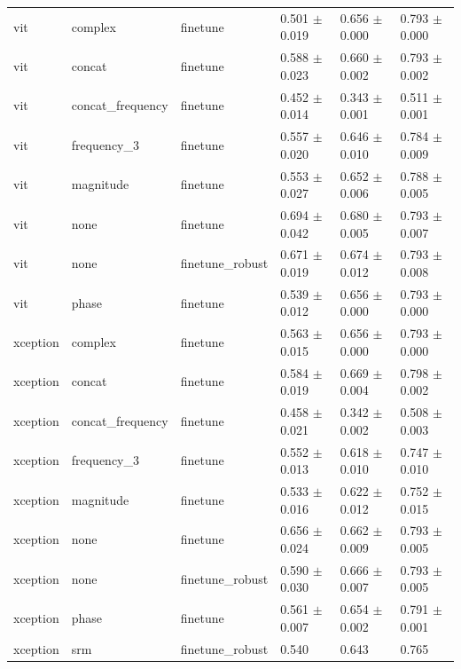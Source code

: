 \begin{table}
\begin{tabular}{llllll}
vit & complex & finetune & 0.501 $\pm$ 0.019 & 0.656 $\pm$ 0.000 & 0.793 $\pm$ 0.000 \\
vit & concat & finetune & 0.588 $\pm$ 0.023 & 0.660 $\pm$ 0.002 & 0.793 $\pm$ 0.002 \\
vit & concat_frequency & finetune & 0.452 $\pm$ 0.014 & 0.343 $\pm$ 0.001 & 0.511 $\pm$ 0.001 \\
vit & frequency_3 & finetune & 0.557 $\pm$ 0.020 & 0.646 $\pm$ 0.010 & 0.784 $\pm$ 0.009 \\
vit & magnitude & finetune & 0.553 $\pm$ 0.027 & 0.652 $\pm$ 0.006 & 0.788 $\pm$ 0.005 \\
vit & none & finetune & 0.694 $\pm$ 0.042 & 0.680 $\pm$ 0.005 & 0.793 $\pm$ 0.007 \\
vit & none & finetune_robust & 0.671 $\pm$ 0.019 & 0.674 $\pm$ 0.012 & 0.793 $\pm$ 0.008 \\
vit & phase & finetune & 0.539 $\pm$ 0.012 & 0.656 $\pm$ 0.000 & 0.793 $\pm$ 0.000 \\
xception & complex & finetune & 0.563 $\pm$ 0.015 & 0.656 $\pm$ 0.000 & 0.793 $\pm$ 0.000 \\
xception & concat & finetune & 0.584 $\pm$ 0.019 & 0.669 $\pm$ 0.004 & 0.798 $\pm$ 0.002 \\
xception & concat_frequency & finetune & 0.458 $\pm$ 0.021 & 0.342 $\pm$ 0.002 & 0.508 $\pm$ 0.003 \\
xception & frequency_3 & finetune & 0.552 $\pm$ 0.013 & 0.618 $\pm$ 0.010 & 0.747 $\pm$ 0.010 \\
xception & magnitude & finetune & 0.533 $\pm$ 0.016 & 0.622 $\pm$ 0.012 & 0.752 $\pm$ 0.015 \\
xception & none & finetune & 0.656 $\pm$ 0.024 & 0.662 $\pm$ 0.009 & 0.793 $\pm$ 0.005 \\
xception & none & finetune_robust & 0.590 $\pm$ 0.030 & 0.666 $\pm$ 0.007 & 0.793 $\pm$ 0.005 \\
xception & phase & finetune & 0.561 $\pm$ 0.007 & 0.654 $\pm$ 0.002 & 0.791 $\pm$ 0.001 \\
xception & srm & finetune_robust & 0.540 & 0.643 & 0.765 \\
\bottomrule
\end{tabular}
\end{table}
